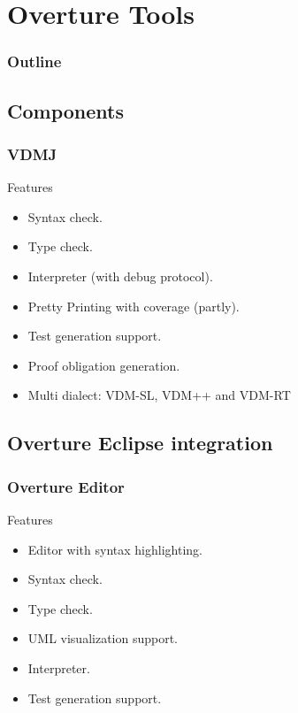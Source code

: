 \section{Overture Tools}

\begin{frame}
  \frametitle{Outline}
  \tableofcontents[current]
\end{frame}

\subsection{Components}
\frame
{
  \frametitle{VDMJ}

  \begin{block}{Features}
	{\scriptsize\begin{itemize}
		\item Syntax check.      
		\item Type check.
		\item Interpreter (with debug protocol).
		\item Pretty Printing with coverage (partly).
		\item Test generation support.
		\item Proof obligation generation.
		\item Multi dialect: VDM-SL, VDM++ and VDM-RT
  \end{itemize}}
  \end{block}
}


\subsection{Overture Eclipse integration}
\frame
{
  \frametitle{Overture Editor}

  \begin{block}{Features}
	{\scriptsize\begin{itemize}
	  \item Editor with syntax highlighting.
	  \item Syntax check.      
	  \item Type check.
	  \item UML visualization support.
	  \item Interpreter.
	  \item Test generation support.
  \end{itemize}}
  \end{block}
}

